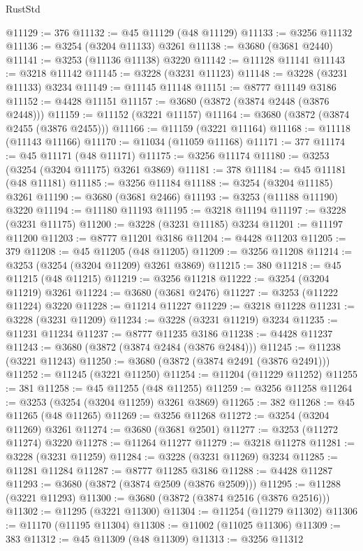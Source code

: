 \begin{lexlean}{RustStd}
\begin{coremodule}
{\begin{coremodule}
{{{{{{{{{{{{{{{{{{{{{{{{{{{{{{{{{{{{{@11129 := 376
@11132 := @45 @11129 (@48 @11129)
@11133 := @3256 @11132
@11136 := @3254 (@3204 @11133) @3261
@11138 := @3680 (@3681 @2440)
@11141 := @3253 (@11136 @11138) @3220
@11142 := @11128 @11141
@11143 := @3218 @11142
@11145 := @3228 (@3231 @11123)
@11148 := @3228 (@3231 @11133) @3234
@11149 := @11145 @11148
@11151 := @8777 @11149 @3186
@11152 := @4428 @11151
@11157 := @3680 (@3872 (@3874 @2448 (@3876 @2448)))
@11159 := @11152 (@3221 @11157)
@11164 := @3680 (@3872 (@3874 @2455 (@3876 @2455)))
@11166 := @11159 (@3221 @11164)
@11168 := @11118 (@11143 @11166)
@11170 := @11034 (@11059 @11168)
@11171 := 377
@11174 := @45 @11171 (@48 @11171)
@11175 := @3256 @11174
@11180 := @3253 (@3254 (@3204 @11175) @3261 @3869)
@11181 := 378
@11184 := @45 @11181 (@48 @11181)
@11185 := @3256 @11184
@11188 := @3254 (@3204 @11185) @3261
@11190 := @3680 (@3681 @2466)
@11193 := @3253 (@11188 @11190) @3220
@11194 := @11180 @11193
@11195 := @3218 @11194
@11197 := @3228 (@3231 @11175)
@11200 := @3228 (@3231 @11185) @3234
@11201 := @11197 @11200
@11203 := @8777 @11201 @3186
@11204 := @4428 @11203
@11205 := 379
@11208 := @45 @11205 (@48 @11205)
@11209 := @3256 @11208
@11214 := @3253 (@3254 (@3204 @11209) @3261 @3869)
@11215 := 380
@11218 := @45 @11215 (@48 @11215)
@11219 := @3256 @11218
@11222 := @3254 (@3204 @11219) @3261
@11224 := @3680 (@3681 @2476)
@11227 := @3253 (@11222 @11224) @3220
@11228 := @11214 @11227
@11229 := @3218 @11228
@11231 := @3228 (@3231 @11209)
@11234 := @3228 (@3231 @11219) @3234
@11235 := @11231 @11234
@11237 := @8777 @11235 @3186
@11238 := @4428 @11237
@11243 := @3680 (@3872 (@3874 @2484 (@3876 @2484)))
@11245 := @11238 (@3221 @11243)
@11250 := @3680 (@3872 (@3874 @2491 (@3876 @2491)))
@11252 := @11245 (@3221 @11250)
@11254 := @11204 (@11229 @11252)
@11255 := 381
@11258 := @45 @11255 (@48 @11255)
@11259 := @3256 @11258
@11264 := @3253 (@3254 (@3204 @11259) @3261 @3869)
@11265 := 382
@11268 := @45 @11265 (@48 @11265)
@11269 := @3256 @11268
@11272 := @3254 (@3204 @11269) @3261
@11274 := @3680 (@3681 @2501)
@11277 := @3253 (@11272 @11274) @3220
@11278 := @11264 @11277
@11279 := @3218 @11278
@11281 := @3228 (@3231 @11259)
@11284 := @3228 (@3231 @11269) @3234
@11285 := @11281 @11284
@11287 := @8777 @11285 @3186
@11288 := @4428 @11287
@11293 := @3680 (@3872 (@3874 @2509 (@3876 @2509)))
@11295 := @11288 (@3221 @11293)
@11300 := @3680 (@3872 (@3874 @2516 (@3876 @2516)))
@11302 := @11295 (@3221 @11300)
@11304 := @11254 (@11279 @11302)
@11306 := @11170 (@11195 @11304)
@11308 := @11002 (@11025 @11306)
@11309 := 383
@11312 := @45 @11309 (@48 @11309)
@11313 := @3256 @11312
}}}}}}}}}}}}}}}}}}}}}}}}}}}}}}}}}}}}}
\end{coremodule}}
\end{coremodule}
\end{lexlean}
